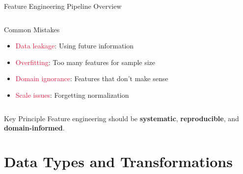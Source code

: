 \documentclass[aspectratio=169,11pt]{beamer}
\begin{document}
\begin{frame}{Feature Engineering Pipeline Overview}
\begin{columns}
\begin{column}{0.5\textwidth}
\begin{block}{Common Mistakes}
\begin{itemize}
\item \textcolor{crimson}{Data leakage}: Using future information
\item \textcolor{crimson}{Overfitting}: Too many features for sample size
\item \textcolor{crimson}{Domain ignorance}: Features that don't make sense
\item \textcolor{crimson}{Scale issues}: Forgetting normalization
\end{itemize}
\end{block}
\end{column}
\end{columns}

\begin{alertblock}{Key Principle}
Feature engineering should be \textbf{systematic}, \textbf{reproducible}, and \textbf{domain-informed}.
\end{alertblock}
\end{frame}

\section{Data Types and Transformations}
\end{document}

